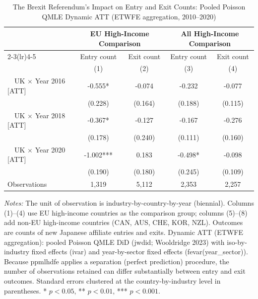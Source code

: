 \begin{table}[!ht]\centering\caption{\label{tab:entryexit\_counts\_etwfe}The Brexit Referendum's Impact on Entry and Exit Counts: Pooled Poisson QMLE Dynamic ATT (ETWFE aggregation, 2010--2020)}\begin{threeparttable}\begin{tabular}{l*{4}{c}}\toprule
\multicolumn{1}{c}{} & \multicolumn{2}{c}{EU High-Income Comparison} & \multicolumn{2}{c}{All High-Income Comparison} \\
\cmidrule(lr){2-3}\cmidrule(lr){4-5}
\multicolumn{1}{c}{} & \multicolumn{1}{c}{Entry count} & \multicolumn{1}{c}{Exit count} & \multicolumn{1}{c}{Entry count} & \multicolumn{1}{c}{Exit count} \\
\midrule
                    &\multicolumn{1}{c}{(1)}&\multicolumn{1}{c}{(2)}&\multicolumn{1}{c}{(3)}&\multicolumn{1}{c}{(4)}\\
\midrule
~~UK $\times$ Year 2016 [ATT]&      -0.555*  &      -0.074   &      -0.232   &      -0.077   \\
                    &     (0.228)   &     (0.164)   &     (0.188)   &     (0.115)   \\
~~UK $\times$ Year 2018 [ATT]&      -0.367*  &      -0.127   &      -0.167   &      -0.276   \\
                    &     (0.178)   &     (0.240)   &     (0.111)   &     (0.160)   \\
~~UK $\times$ Year 2020 [ATT]&      -1.002***&       0.183   &      -0.498*  &      -0.098   \\
                    &     (0.190)   &     (0.180)   &     (0.245)   &     (0.109)   \\
\midrule
Observations        &       1,319   &       5,112   &       2,353   &       2,257   \\
\bottomrule\end{tabular}\end{threeparttable}\par\medskip\parbox{\linewidth}{\footnotesize \textit{Notes:}  The unit of observation is industry-by-country-by-year (biennial). Columns (1)--(4) use EU high-income countries as the comparison group; columns (5)--(8) add non-EU high-income countries (CAN, AUS, CHE, KOR, NZL). Outcomes are counts of new Japanese affiliate entries and exits. Dynamic ATT (ETWFE aggregation): pooled Poisson QMLE DiD (jwdid; Wooldridge 2023) with iso-by-industry fixed effects (ivar) and year-by-sector fixed effects (fevar(year\_sector)). Because ppmlhdfe applies a separation (perfect prediction) procedure, the number of observations retained can differ substantially between entry and exit outcomes. Standard errors clustered at the country-by-industry level in parentheses. * $p<0.05$, ** $p<0.01$, *** $p<0.001$. }\end{table}

